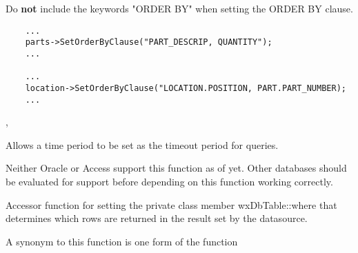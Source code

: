 
Do {\bf not} include the keywords "ORDER BY" when setting the ORDER BY clause.


\begin{verbatim}
    ...
    parts->SetOrderByClause("PART_DESCRIP, QUANTITY");
    ...

    ...
    location->SetOrderByClause("LOCATION.POSITION, PART.PART_NUMBER);
    ...
\end{verbatim}


,

\label{wxdbtablesetquerytimeout}


Allows a time period to be set as the timeout period for queries.




Neither Oracle or Access support this function as of yet.  Other databases
should be evaluated for support before depending on this function working
correctly.

\label{wxdbtablesetwhereclause}


Accessor function for setting the private class member wxDbTable::where
that determines which rows are returned in the result set by the datasource.

A synonym to this function is one form of the function 




